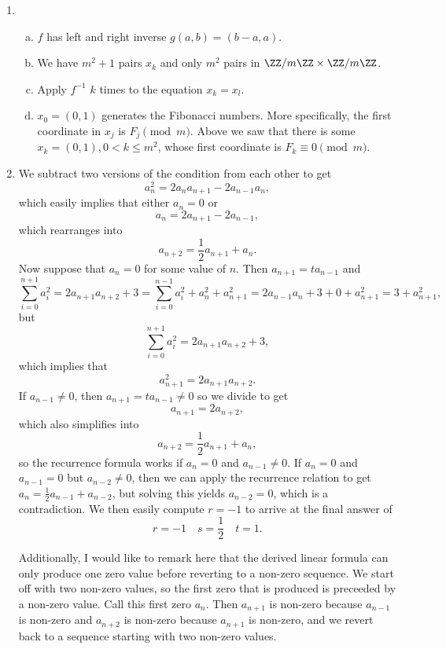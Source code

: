 \documentclass{article}
\begin{document}
\begin{enumerate}
\item
\begin{enumerate}[(a)]
\item
$f$ has left and right inverse $g(a, b) = (b - a, a)$.
\item
We have $m^2 + 1$ pairs $x_k$ and only $m^2$ pairs in $\ZZ / m \ZZ
\times \ZZ / m \ZZ$.
\item
Apply $f^{-1}$ $k$ times to the equation $x_k = x_l$.
\item $x_0 = (0, 1)$ generates the Fibonacci numbers. More specifically,
the first coordinate in $x_j$ is $F_j \pmod{m}$. Above we saw that there
is some $x_k = (0, 1), 0 < k \leq m^2$, whose first coordinate is $F_k
\equiv 0 \pmod{m}$.
\end{enumerate}

\item We subtract two versions of the condition from each other to get
\[ a_n^2 = 2a_{n}a_{n + 1} - 2a_{n - 1}a_{n}, \]
which easily implies that either $a_n = 0$ or
\[ a_n = 2a_{n + 1} - 2a_{n - 1}, \]
which rearranges into
\[ a_{n + 2} = \frac{1}{2}a_{n + 1} + a_{n}. \]
Now suppose that $a_n = 0$ for some value of $n$. Then $a_{n + 1} =
ta_{n - 1}$ and
\[ \sum_{i = 0}^{n + 1}a_i^2 = 2a_{n + 1}a_{n + 2} + 3 = \sum_{i = 0}^{n
- 1} a_i^2 + a_n^2 + a_{n + 1}^2 = 2a_{n - 1}a_{n} + 3 + 0 + a_{n + 1}^2
= 3 + a_{n + 1}^2, \]
but
\[ \sum_{i = 0}^{n + 1}a_i^2 = 2a_{n + 1}a_{n + 2} + 3, \]
which implies that
\[ a_{n + 1}^2 = 2a_{n + 1}a_{n + 2}. \]
If $a_{n - 1} \neq 0$, then $a_{n + 1} = ta_{n - 1} \neq 0$ so we divide
to get
\[ a_{n + 1} = 2a_{n + 2}, \]
which also simplifies into
\[ a_{n + 2} = \frac{1}{2}a_{n + 1} + a_n, \]
so the recurrence formula works if $a_n = 0$ and $a_{n - 1} \neq 0$. If
$a_n = 0$ and $a_{n - 1} = 0$ but $a_{n - 2} \neq 0$, then we can apply
the recurrence relation to get $a_{n} = \frac{1}{2}a_{n - 1} + a_{n -
2}$, but solving this yields $a_{n - 2} = 0$, which is a contradiction.
We then easily compute $r = -1$ to arrive at the final answer of
\[ \boxed{r = -1 \quad s = \frac{1}{2} \quad t = 1}. \]

Additionally, I would like to remark here that the derived linear
formula can only produce one zero value before reverting to a non-zero
sequence.  We start off with two non-zero values, so the first zero that
is produced is preceeded by a non-zero value. Call this first zero
$a_n$.  Then $a_{n + 1}$ is non-zero because $a_{n - 1}$ is non-zero and
$a_{n + 2}$ is non-zero because $a_{n + 1}$ is non-zero, and we revert
back to a sequence starting with two non-zero values.

\end{enumerate}
\end{document}
